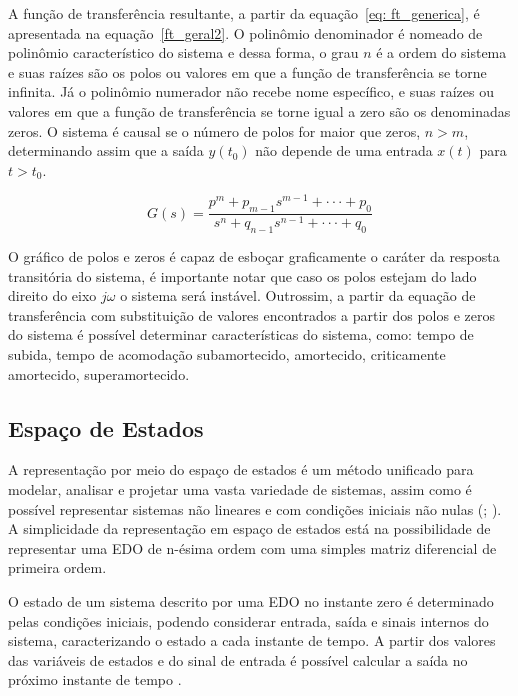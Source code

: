 A função de transferência resultante, a partir da equação~\ref{eq: ft_generica}, é apresentada na equação~\ref{ft_geral2}. O polinômio denominador é nomeado de polinômio característico do sistema e dessa forma, o grau $n$ é a ordem do sistema e suas raízes são os polos ou valores em que a função de transferência se torne infinita. Já o polinômio numerador não recebe nome específico, e suas raízes ou valores em que a função de transferência se torne igual a zero são os denominadas zeros. O sistema é causal se o número de polos for maior que zeros,  $n>m$, determinando assim que a saída $y(t_0)$ não depende de uma entrada $x(t)$ para $t>t_0$.

\begin{equation}
G(s) = \frac{p^m + p_{m-1}s^{m-1}+\cdot\cdot\cdot+p_0}{s^n + q_{n-1}s^{n-1} +\cdot\cdot\cdot+q_0} \label{ft_geral2}
\end{equation}

O gráfico de polos e zeros é capaz de esboçar graficamente o caráter da resposta transitória do sistema, é importante notar que caso os polos estejam do lado direito do eixo $j\omega$ o sistema será instável. Outrossim, a partir da equação de transferência com substituição de valores encontrados a partir dos polos e zeros do sistema é possível determinar características do sistema, como: tempo de subida, tempo de acomodação subamortecido, amortecido, criticamente amortecido, superamortecido.


\subsection{Espaço de Estados}

A representação por meio do espaço de estados é um método unificado para modelar, analisar e projetar uma vasta variedade de sistemas, assim como é possível representar sistemas não lineares e com condições iniciais não nulas (\cite{nise}; \cite{Aguirre2004}). A simplicidade da representação em espaço de estados está na possibilidade de representar uma EDO de n-ésima ordem com uma simples matriz diferencial de primeira ordem.

O estado de um sistema descrito por uma EDO no instante zero é determinado pelas condições iniciais, podendo considerar entrada, saída e sinais internos do sistema, caracterizando o estado a cada instante de tempo. A partir dos valores das variáveis de estados e do sinal de entrada é possível calcular a saída no próximo instante de tempo \cite{keviczky2019control}. 

